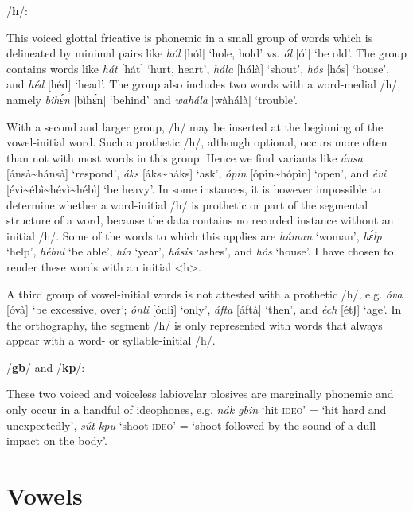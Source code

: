 /\textbf{h}/:

This voiced glottal fricative is phonemic in a small group of words which is delineated by minimal pairs like \textit{hól} [hól] ‘hole, hold’ vs. \textit{ól} [ól] ‘be old’. The group contains words like \textit{hát} [hát] ‘hurt, heart’, \textit{hála} [hálà] ‘shout’, \textit{hós} [hós] ‘house’, and \textit{héd} [héd] ‘head’. The group also includes two words with a word-medial /h/, namely \textit{bihɛ́n} [bìhɛ́n] ‘behind’ and \textit{wahála} [wàhálà] ‘trouble’. 


With a second and larger group, /h/ may be inserted at the beginning of the vowel-initial word. Such a prothetic /h/, although optional, occurs more often than not with most words in this group. Hence we find variants like \textit{ánsa} [ánsà\textasciitilde hánsà] ‘respond’, \textit{áks} [áks\textasciitilde háks] ‘ask’, \textit{ópin} [ópìn\textasciitilde hópìn] ‘open’, and \textit{évi} [évì\textasciitilde ébì\textasciitilde hévì\textasciitilde hébì] ‘be heavy’. In some instances, it is however impossible to determine whether a word-initial /h/ is prothetic or part of the segmental structure of a word, because the data contains no recorded instance without an initial /h/. Some of the words to which this applies are \textit{húman} ‘woman’, \textit{hɛ́lp} ‘help’, \textit{hébul} ‘be able’, \textit{hía} ‘year’, \textit{hásis} ‘ashes’, and \textit{hós} ‘house’. I have chosen to render these words with an initial <h>.{\fff}



A third group of vowel-initial words is not attested with a prothetic /h/, e.g. \textit{óva} [óvà] ‘be excessive, over’; \textit{ónli} [ónlì] ‘only’, \textit{áfta} [áftà] ‘then’, and \textit{éch} [étʃ] ‘age’. In the orthography, the segment /h/ is only represented with words that always appear with a word- or syllable-initial /h/. 

\newpage
/\textbf{gb}/ and /\textbf{kp}/:

These two voiced and voiceless labiovelar plosives are marginally phonemic and only occur in a handful of ideophones, e.g.\textit{ nák gbin} ‘hit \textsc{ideo}’ = ‘hit hard and unexpectedly’, \textit{sút kpu} ‘shoot \textsc{ideo}’ = ‘shoot followed by the sound of a dull impact on the body’.

\section{Vowels}\label{sec:2.3}

